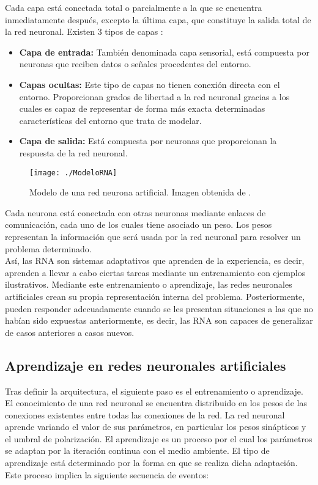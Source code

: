 \documentclass[a4paper, 12pt, oneside]{book}
\begin{document}
Cada capa está conectada total o parcialmente a la que se encuentra inmediatamente después, excepto la última capa, que constituye la salida total de la red neuronal. Existen 3 tipos de capas \cite{TiposCapasRNA}:

\begin{itemize}
\item \textbf{Capa de entrada:} También denominada capa sensorial, está compuesta por neuronas que reciben datos o señales procedentes del entorno.
\item \textbf{Capas ocultas:} Este tipo de capas no tienen conexión directa con el entorno. Proporcionan grados de libertad a la red neuronal gracias a los cuales es capaz de representar de forma más exacta determinadas características del entorno que trata de modelar.
\item \textbf{Capa de salida:} Está compuesta por neuronas que proporcionan la respuesta de la red neuronal.
\end{itemize}

\begin{figure}[H]
\begin{center}
\texttt{[image: ./ModeloRNA]}
\caption{Modelo de una red neurona artificial. Imagen obtenida de \cite{CapasRNA}.}
\label{ModeloRNA}
\end{center}
\end{figure}

Cada neurona está conectada con otras neuronas mediante enlaces de comunicación, cada uno de los cuales tiene asociado un peso. Los pesos representan la información que será usada por la red neuronal para resolver un problema determinado.\\

Así, las RNA son sistemas adaptativos que aprenden de la experiencia, es decir, aprenden a llevar a cabo ciertas tareas mediante un entrenamiento con ejemplos ilustrativos. Mediante este entrenamiento o aprendizaje, las redes neuronales artificiales crean su propia representación interna del problema. Posteriormente, pueden responder adecuadamente cuando se les presentan situaciones a las que no habían sido expuestas anteriormente, es decir, las RNA son capaces de generalizar de casos anteriores a casos nuevos.

\subsection{Aprendizaje en redes neuronales artificiales}

Tras definir la arquitectura, el siguiente paso es el entrenamiento o aprendizaje. El conocimiento de una red neuronal se encuentra distribuido en los pesos de las conexiones existentes entre todas las conexiones de la red. La red neuronal aprende variando el valor de sus parámetros, en particular los pesos sinápticos y el umbral de polarización. El aprendizaje es un proceso por el cual los parámetros se adaptan por la iteración continua con el medio ambiente. El tipo de aprendizaje está determinado por la forma en que se realiza dicha adaptación. Este proceso implica la siguiente secuencia de eventos:
\end{document}
